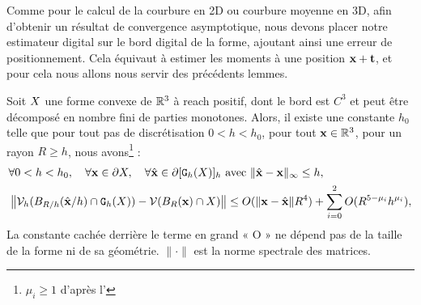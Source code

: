 %
Comme pour le calcul de la courbure en 2D ou courbure moyenne en 3D, afin d'obtenir un
résultat de convergence asymptotique, nous devons placer notre estimateur
digital sur le bord digital de la forme, ajoutant ainsi une erreur de positionnement.
Cela équivaut à estimer les moments à une position $\mathbf{x} + \mathbf{t}$, et pour cela
nous allons nous servir des précédents lemmes.
%
\begin{theorem}{}
\label{thm:multigrid-conv-cov-matrix}
%
  Soit $X$ une forme convexe de $\mathbb{R}^3$ à reach positif, dont le bord est
  $C^3$ et peut être décomposé en nombre fini de parties monotones. Alors, il
  existe une constante $h_0$ telle que pour tout pas de discrétisation $0 < h <
  h_0$, pour tout $\mathbf{x} \in \mathbb{R}^3$, pour un rayon $R \ge h$, nous
  avons\footnote{$\mu_i \ge 1$ d'après
  l'} :
%
  \begin{align}
    &\forall 0 < h < h_0, \quad \forall \mathbf{x} \in \partial X, \quad
    \forall \hat{\mathbf{x}} \in \partial \lbrack \mathtt{G}_{h}(X) \rbrack_{h} \text{~avec~} \| \hat{\mathbf{x}} -\mathbf{x}\|_\infty \le h, \nonumber \\
    &\left\| \mathcal{V}_{h}( B_{R/h}(\hat{\mathbf{x}}/h) \cap  \mathtt{G}_{h}(X) ) - \mathcal{V}( B_{R}(\mathbf{x}) \cap X )\right \|\le O(\|\mathbf{x}-\hat{\mathbf{x}}\| R^4) + \sum_{i=0}^2 O(R^{5-\mu_i}h^{\mu_i}),
  \end{align}
  La constante cachée derrière le terme en grand « O » ne dépend pas de la
  taille de la forme ni de sa géométrie. $\|\cdot\|$ est la norme spectrale des
  matrices.
\end{theorem}

